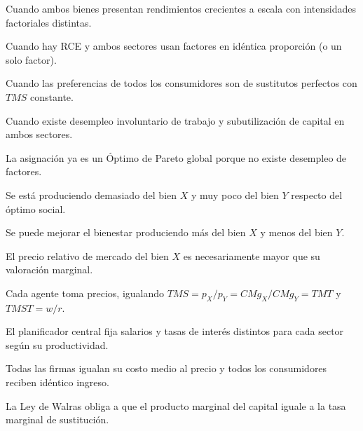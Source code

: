 \begin{opts}
    \item Cuando ambos bienes presentan rendimientos crecientes a escala con intensidades factoriales distintas.
    \item Cuando hay RCE y ambos sectores usan factores en idéntica proporción (o un solo factor).
    \item Cuando las preferencias de todos los consumidores son de sustitutos perfectos con $TMS$ constante.
    \item Cuando existe desempleo involuntario de trabajo y subutilización de capital en ambos sectores.
\end{opts}

\begin{opts}
    \item La asignación ya es un Óptimo de Pareto global porque no existe desempleo de factores.
    \item Se está produciendo demasiado del bien $X$ y muy poco del bien $Y$ respecto del óptimo social.
    \item Se puede mejorar el bienestar produciendo más del bien $X$ y menos del bien $Y$.
    \item El precio relativo de mercado del bien $X$ es necesariamente mayor que su valoración marginal.
\end{opts}

\begin{opts}
    \item Cada agente toma precios, igualando $TMS = p_X/p_Y = CMg_X/CMg_Y = TMT$ y $TMST = w/r$.
    \item El planificador central fija salarios y tasas de interés distintos para cada sector según su productividad.
    \item Todas las firmas igualan su costo medio al precio y todos los consumidores reciben idéntico ingreso.
    \item La Ley de Walras obliga a que el producto marginal del capital iguale a la tasa marginal de sustitución.
\end{opts}

